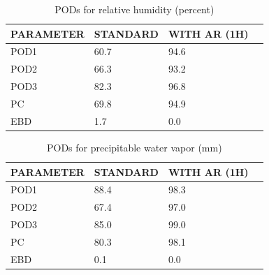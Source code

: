 \documentclass[a4paper,english]{article}
\begin{document}
\begin{table}[]
\begin{center}
\begin{tabular}{|l|l|l|l|}
\hline
\multicolumn{1}{|c|}{\cellcolor[HTML]{C0C0C0}\textbf{PARAMETER}} & \multicolumn{1}{c|}{\cellcolor[HTML]{C0C0C0}\textbf{STANDARD}} & \multicolumn{1}{c|}{\cellcolor[HTML]{C0C0C0}\textbf{WITH AR (1H)}} \\
\hline
\cellcolor[HTML]{C0C0C0}POD1  & 60.7                                & 94.6         \\
\cellcolor[HTML]{C0C0C0}POD2  & 66.3                                & 93.2         \\
\cellcolor[HTML]{C0C0C0}POD3  & 82.3                                & 96.8         \\
\cellcolor[HTML]{C0C0C0}PC    & 69.8                                  & 94.9           \\
\cellcolor[HTML]{C0C0C0}EBD   & 1.7                                 & 0.0          \\
\hline
\end{tabular}
\caption{PODs for relative humidity (percent)}
\end{center}
\end{table}
\begin{table}[]
\begin{center}
\begin{tabular}{|l|l|l|l|}
\hline
\multicolumn{1}{|c|}{\cellcolor[HTML]{C0C0C0}\textbf{PARAMETER}} & \multicolumn{1}{c|}{\cellcolor[HTML]{C0C0C0}\textbf{STANDARD}} & \multicolumn{1}{c|}{\cellcolor[HTML]{C0C0C0}\textbf{WITH AR (1H)}} \\
\hline
\cellcolor[HTML]{C0C0C0}POD1  & 88.4                                & 98.3         \\
\cellcolor[HTML]{C0C0C0}POD2  & 67.4                                & 97.0         \\
\cellcolor[HTML]{C0C0C0}POD3  & 85.0                                & 99.0         \\
\cellcolor[HTML]{C0C0C0}PC    & 80.3                                  & 98.1           \\
\cellcolor[HTML]{C0C0C0}EBD   & 0.1                                 & 0.0          \\
\hline
\end{tabular}
\caption{PODs for precipitable water vapor (mm)}
\end{center}
\end{table}
\end{document}
